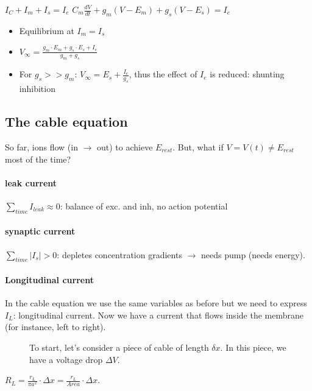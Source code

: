 \documentclass[main]{subfiles}
\begin{document}
$I_C + I_m + I_s = I_e$
$C_m \frac{dV}{dt} + g_m (V - E_m) + g_s(V - E_s) = I_e$

\begin{itemize}[noitemsep,nolistsep]
	\item Equilibrium at $I_m=I_s$
	\item $V_\infty = \frac{g_m \cdot E_m + g_s \cdot E_s + I_e}{g_m+g_s}$
	\item For $g_s >> g_m$: $V_\infty = E_s + \frac{I_e}{g_s}$, thus the effect of $I_e$ is reduced: shunting inhibition
\end{itemize}

\subsection{The cable equation}

So far, ions flow (in $\rightarrow$ out) to achieve $E_{rest}$. But, what if $V = V(t) \neq E_{rest}$ most of the time?

\paragraph{leak current}
$\sum_{time} I_{leak} \approx 0$: balance of exc. and inh, no action potential
\paragraph{synaptic current}
$\sum_{time} |I_s| > 0$: depletes concentration gradients $\rightarrow$ needs pump (needs energy).

\paragraph{Longitudinal current}

In the cable equation we use the same variables as before but we need to express $I_L$: longitudinal current. Now we have a current that flows inside the membrane (for instance, left to right).

\begin{figure}[H]
	\centering
	\caption{To start, let's consider a piece of cable of length $\delta x$. In this piece, we have a voltage drop $\Delta V$.}
\end{figure}

$R_L = \frac{r_L}{\pi a^2} \cdot \Delta x = \frac{r_L}{Area} \cdot \Delta x$.
\end{document}
